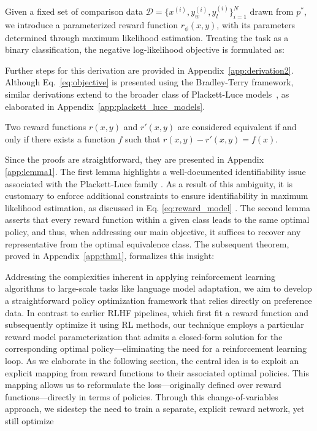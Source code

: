 Given a fixed set of comparison data $\mathcal{D}=\bigl\{x^{(i)}, y_w^{(i)}, y_l^{(i)}\bigr\}_{i=1}^N$ drawn from $p^*$, we introduce a parameterized reward function $r_{\phi}(x, y)$, with its parameters determined through maximum likelihood estimation. Treating the task as a binary classification, the negative log-likelihood objective is formulated as:

Further steps for this derivation are provided in Appendix~\ref{app:derivation2}. Although Eq.~\ref{eq:objective} is presented using the Bradley-Terry framework, similar derivations extend to the broader class of Plackett-Luce models~\citep{plackett1975analysis, luce2012individual}, as elaborated in Appendix~\ref{app:plackett_luce_models}.

\begin{definition}
Two reward functions $r(x, y)$ and $r'(x, y)$ are considered equivalent if and only if there exists a function $f$ such that ${r(x, y)-r'(x, y) = f(x)}$.
\end{definition}

Since the proofs are straightforward, they are presented in Appendix \ref{app:lemma1}. The first lemma highlights a well-documented identifiability issue associated with the Plackett-Luce family \cite{plackett1975analysis}. As a result of this ambiguity, it is customary to enforce additional constraints to ensure identifiability in maximum likelihood estimation, as discussed in Eq. \ref{eq:reward_model} \cite{bong2022generalized}. The second lemma asserts that every reward function within a given class leads to the same optimal policy, and thus, when addressing our main objective, it suffices to recover any representative from the optimal equivalence class. The subsequent theorem, proved in Appendix~\ref{app:thm1}, formalizes this insight:

Addressing the complexities inherent in applying reinforcement learning algorithms to large-scale tasks like language model adaptation, we aim to develop a straightforward policy optimization framework that relies directly on preference data. In contrast to earlier RLHF pipelines, which first fit a reward function and subsequently optimize it using RL methods, our technique employs a particular reward model parameterization that admits a closed-form solution for the corresponding optimal policy—eliminating the need for a reinforcement learning loop. As we elaborate in the following section, the central idea is to exploit an explicit mapping from reward functions to their associated optimal policies. This mapping allows us to reformulate the loss—originally defined over reward functions—directly in terms of policies. Through this change-of-variables approach, we sidestep the need to train a separate, explicit reward network, yet still optimize

